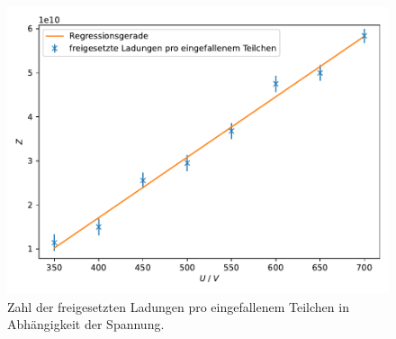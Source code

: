 \begin{figure}[H]
  \centering
  \includegraphics[width=\textwidth]{build/plot2.pdf}
  \caption{Zahl der freigesetzten Ladungen pro eingefallenem Teilchen in Abhängigkeit der Spannung.}
  \label{fig:plot2}
\end{figure}
